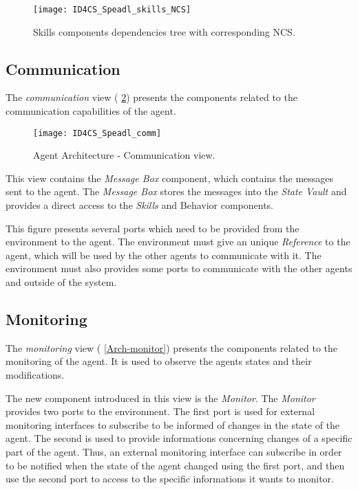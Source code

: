\begin{figure}
\centering
\texttt{[image: ID4CS\_Speadl\_skills\_NCS]}
\caption{Skills components dependencies tree with corresponding NCS.}\label{skills:NCS}
\end{figure}

\subsection{Communication}

The \emph{communication} view (\figurename{} \ref{Arch-comm}) presents the components related to the communication capabilities of the agent. 

\begin{figure}
\centering
\texttt{[image: ID4CS\_Speadl\_comm]}
\caption{Agent Architecture - Communication view.}
\label{Arch-comm}
\end{figure}

This view contains the \emph{Message Box} component, which contains the messages sent to the agent. The \emph{Message Box} stores the messages into the \emph{State Vault} and provides a direct access to the \emph{Skills} and {Behavior} components.

This figure presents several ports which need to be provided from the environment to the agent. The environment must give an unique \emph{Reference} to the agent, which will be used by the other agents to communicate with it. The environment must also provides some ports to communicate with the other agents and outside of the system.

\subsection{Monitoring}

The \emph{monitoring} view (\figurename{} \ref{Arch-monitor}) presents the components related to the monitoring of the agent. It is used to observe the agents states and their modifications.

The new component introduced in this view is the \emph{Monitor}. The \emph{Monitor} provides two ports to the environment. The first port is used for external monitoring interfaces to subscribe to be informed of changes in the state of the agent. The second is used to provide informations concerning changes of a specific part of the agent. Thus, an external monitoring interface can subscribe in order to be notified when the state of the agent changed using the first port, and then use the second port to access to the specific informations it wants to monitor.

